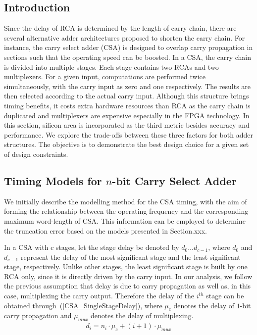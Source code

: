 \documentclass[journal]{IEEEtran}
\begin{document}
\subsection{Introduction}
Since the delay of RCA is determined by the length of carry chain, there are several alternative adder architectures proposed to shorten the carry chain. For instance, the carry select adder (CSA) is designed to overlap carry propagation in sections such that the operating speed can be boosted. In a CSA, the carry chain is divided into multiple stages. Each stage contains two RCAs and two multiplexers. For a given input, computations are performed twice simultaneously, with the carry input as zero and one respectively. The results are then selected according to the actual carry input. Although this structure brings timing benefits, it costs extra hardware resources than RCA as the carry chain is duplicated and multiplexers are expensive especially in the FPGA technology. In this section, silicon area is incorporated as the third metric besides accuracy and performance. We explore the trade-offs between these three factors for both adder structures. The objective is to demonstrate the best design choice for a given set of design constraints.


\subsection{Timing Models for $n$-bit Carry Select Adder}
We initially describe the modelling method for the CSA timing, with the aim of forming the relationship between the operating frequency and the corresponding maximum word-length of CSA. This information can be employed to determine the truncation error based on the models presented in Section.xxx.

In a CSA with $c$ stages, let the stage delay be denoted by $d_{0}\dots d_{c-1}$, where $d_{0}$ and $d_{c-1}$ represent the delay of the most significant stage and the least significant stage, respectively. Unlike other stages, the least significant stage is built by one RCA only, since it is directly driven by the carry input. In our analysis, we follow the previous assumption that delay is due to carry propagation as well as, in this case, multiplexing the carry output. Therefore the delay of the $i^{th}$ stage can be obtained through~(\ref{CSA_SingleStageDelay}), where $\mu_{c}$ denotes the delay of $1$-bit carry propagation and $\mu_{mux}$ denotes the delay of multiplexing.
\begin{eqnarray}\label{CSA_SingleStageDelay}
  d_i=n_i\cdot \mu_{c}+(i+1)\cdot\mu_{mux} 
\end{eqnarray}
\end{document}
